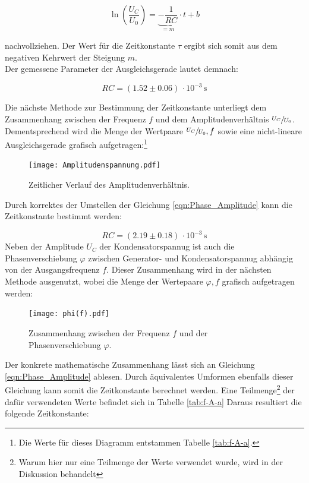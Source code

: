 \begin{equation}
    \ln\left(\frac{U_C}{U_0}\right) = \underbrace{-\frac{1}{RC}}_{=m} \cdot t + b
\end{equation}

\noindent nachvollziehen. Der Wert für die Zeitkonstante $\tau$ ergibt sich somit aus dem negativen Kehrwert der Steigung $m$.\\
Der gemessene Parameter der Ausgleichsgerade lautet demnach:

\begin{equation}
    RC = \left(1.52 \pm 0.06\right)\,\cdot 10^{-3}\,\unit{\second}
\end{equation}

\noindent Die nächste Methode zur Bestimmung der Zeitkonstante unterliegt dem Zusammenhang zwischen der Frequenz $f$ und dem 
Amplitudenverhältnis $\sfrac{U_C}{U_0}$. Dementsprechend wird die Menge der Wertpaare ${\sfrac{U_C}{U_0},f}$ sowie eine 
nicht-lineare Ausgleichsgerade grafisch aufgetragen:\footnote{Die Werte für dieses Diagramm entstammen Tabelle \ref{tab:f-A-a}.}

\begin{figure}
    \centering
    \texttt{[image: Amplitudenspannung.pdf]}
    \caption{Zeitlicher Verlauf des Amplitudenverhältnis.}
    \label{fig:Amplitudenverlauf}
\end{figure}

\noindent Durch korrektes der Umstellen der Gleichung \eqref{eqn:Phase_Amplitude} kann die Zeitkonstante bestimmt werden:

\begin{equation}
    RC = \left(2.19 \pm 0.18\right)\,\cdot 10^{-3}\,\unit{\second}
\end{equation}
\newpage
\noindent Neben der Amplitude $U_C$ der Kondensatorspannug ist auch die Phasenverschiebung $\varphi$ zwischen Generator- und
Kondensatorspannug abhängig von der Ausgangsfrequenz $f$. Dieser Zusammenhang wird in der nächsten Methode ausgenutzt, wobei 
die Menge der Wertepaare ${\varphi , f}$ grafisch aufgetragen werden: 

\begin{figure}[H]
    \centering
    \texttt{[image: phi(f).pdf]}
    \caption{Zusammenhang zwischen der Frequenz $f$ und der Phasenverschiebung $\varphi$.}
    \label{fig:Phasenverschiebung}
\end{figure}

\noindent Der konkrete mathematische Zusammenhang lässt sich an 
Gleichung \eqref{eqn:Phase_Amplitude} ablesen. Durch äquivalentes Umformen ebenfalls dieser Gleichung kann somit die Zeitkonstante
berechnet werden. Eine Teilmenge\footnote{Warum hier nur eine Teilmenge der Werte verwendet wurde, wird in der Diskussion behandelt} der dafür verwendeten Werte befindet sich in Tabelle \ref{tab:f-A-a}
Daraus resultiert die folgende Zeitkonstante:

